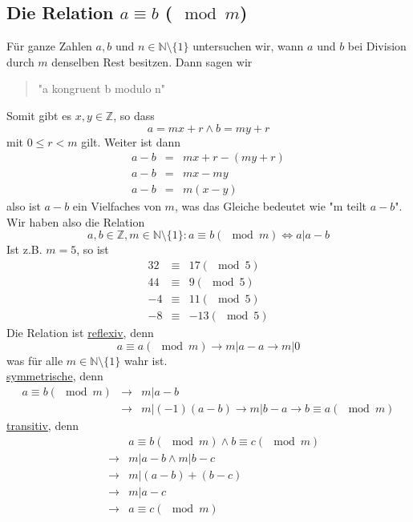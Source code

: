\documentclass{report}
\begin{document}
\subsection{Die Relation $a \equiv b$ ($\mod{m}$)}
Für ganze Zahlen $a, b$ und $n \in \mathbb{N} \setminus \{1\}$ untersuchen wir, wann $a$ und $b$ bei Division durch $m$ denselben Rest besitzen. Dann sagen wir
\begin{quote}"a kongruent b modulo n"\end{quote}
Somit gibt es $x, y \in \mathbb{Z}$, so dass
\begin{equation}a = mx + r \land b = my + r\end{equation}
mit $0 \leq r < m$ gilt. Weiter ist dann
\begin{eqnarray}a - b & = & mx + r - (my + r) \nonumber \\
a - b & = & mx - my \nonumber \\
a - b & = & m(x - y)\end{eqnarray}
also ist $a-b$ ein Vielfaches von $m$, was das Gleiche bedeutet wie "m teilt $a-b$". Wir haben also die Relation
\begin{equation}a, b \in \mathbb{Z}, m \in \mathbb{N} \setminus \{1\}: a \equiv b (\mod{m}) \iff a | a - b\end{equation}
Ist z.B. $m = 5$, so ist
\begin{eqnarray}32 & \equiv & 17 (\mod{5}) \\
44 & \equiv & 9 (\mod{5}) \\
-4 & \equiv & 11 (\mod{5}) \\
-8 & \equiv & -13 (\mod{5})\end{eqnarray}
Die Relation ist \underline{reflexiv}, denn
\begin{equation}a \equiv a (\mod{m}) \to m | a - a \to m | 0\end{equation}
was für alle $m \in \mathbb{N} \setminus \{1\}$ wahr ist.\\
\underline{symmetrische}, denn
\begin{eqnarray}a \equiv b (\mod{m}) & \to & m | a - b \nonumber \\
& \to & m | (-1)(a-b) \to m | b-a \to b \equiv a (\mod{m})\end{eqnarray}
\underline{transitiv}, denn
\begin{eqnarray}& & a \equiv b (\mod{m}) \land b \equiv c (\mod{m}) \nonumber \\
& \to & m | a - b \land m | b - c\nonumber \\
& \to & m | (a - b) + (b - c)\nonumber \\
& \to & m | a - c\nonumber \\\
& \to & a \equiv c (\mod{m})\end{eqnarray}
\end{document}
